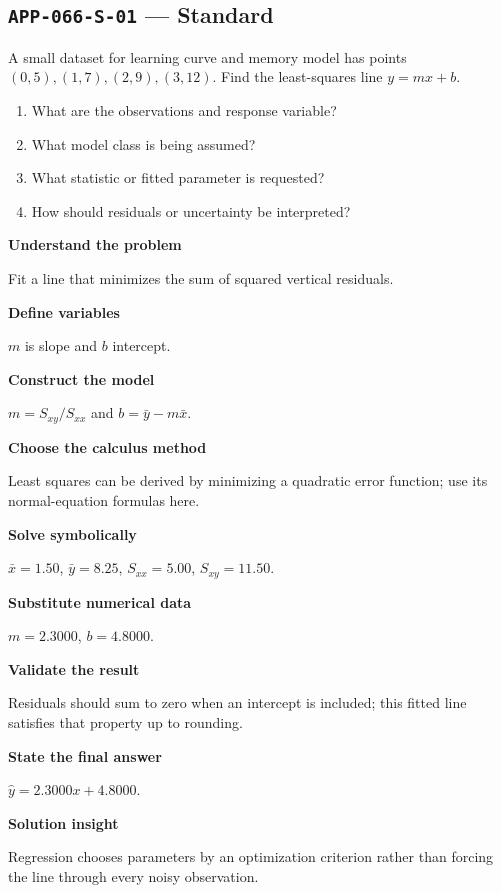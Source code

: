\documentclass[11pt]{book}
\newcommand{\pid}[1]{\texttt{#1}}
\begin{document}
\subsection*{\pid{APP-066-S-01} — Standard}
\begin{problembox}
A small dataset for learning curve and memory model has points $(0,5),(1,7),(2,9),(3,12)$. Find the least-squares line $y=mx+b$.
\end{problembox}
\begin{promptbox}\begin{enumerate}
\item What are the observations and response variable?
\item What model class is being assumed?
\item What statistic or fitted parameter is requested?
\item How should residuals or uncertainty be interpreted?
\end{enumerate}\end{promptbox}
\begin{solutionbox}
\textbf{Understand the problem}\par Fit a line that minimizes the sum of squared vertical residuals.\par\medskip
\textbf{Define variables}\par $m$ is slope and $b$ intercept.\par\medskip
\textbf{Construct the model}\par $m=S_{xy}/S_{xx}$ and $b=\bar y-m\bar x$.\par\medskip
\textbf{Choose the calculus method}\par Least squares can be derived by minimizing a quadratic error function; use its normal-equation formulas here.\par\medskip
\textbf{Solve symbolically}\par $\bar x=1.50$, $\bar y=8.25$, $S_{xx}=5.00$, $S_{xy}=11.50$.\par\medskip
\textbf{Substitute numerical data}\par $m=2.3000$, $b=4.8000$.\par\medskip
\textbf{Validate the result}\par Residuals should sum to zero when an intercept is included; this fitted line satisfies that property up to rounding.\par\medskip
\textbf{State the final answer}\par $\hat y=2.3000x+4.8000$.\par\medskip
\textbf{Solution insight}\par Regression chooses parameters by an optimization criterion rather than forcing the line through every noisy observation.\par\medskip
\end{solutionbox}
\end{document}

